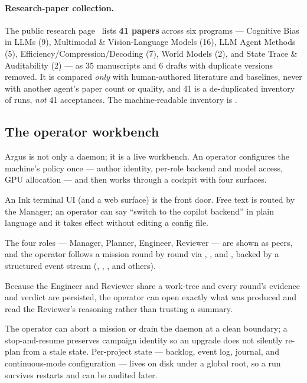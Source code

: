 \paragraph{Research-paper collection.} The public research
page~\cite{argus_research} lists \textbf{41 papers} across six programs ---
Cognitive Bias in LLMs (9), Multimodal \& Vision-Language Models (16), LLM Agent
Methods (5), Efficiency/Compression/Decoding (7), World Models (2), and State
Trace \& Auditability (2) --- as 35 manuscripts and 6 drafts with duplicate
versions removed. It is compared \emph{only} with human-authored literature and
baselines, never with another agent's paper count or quality, and 41 is a
de-duplicated inventory of runs, \emph{not} 41 acceptances. The machine-readable
inventory is .

\subsection{The operator workbench}

Argus is not only a daemon; it is a live workbench. An operator configures the
machine's policy once --- author identity, per-role backend and model access, GPU
allocation --- and then works through a cockpit with four surfaces.

\begin{description}[leftmargin=1.4em, style=nextline]
  \item[Cockpit.] An Ink terminal UI (and a web surface) is the front door. Free
    text is routed by the Manager; an operator can say ``switch to the copilot
    backend'' in plain language and it takes effect without editing a config file.
  \item[Mission view.] The four roles --- Manager, Planner, Engineer, Reviewer ---
    are shown as peers, and the operator follows a mission round by round via
    , , and , backed by a structured
    event stream (, ,
    , and others).
  \item[Inspectable artifacts.] Because the Engineer and Reviewer share a
    work-tree and every round's evidence and verdict are persisted, the operator
    can open exactly what was produced and read the Reviewer's reasoning rather
    than trusting a summary.
  \item[Intervention and persistence.] The operator can abort a mission or drain
    the daemon at a clean boundary; a stop-and-resume preserves campaign identity
    so an upgrade does not silently re-plan from a stale state. Per-project state
    --- backlog, event log, journal, and continuous-mode configuration --- lives on
    disk under a global root, so a run survives restarts and can be audited later.
\end{description}
